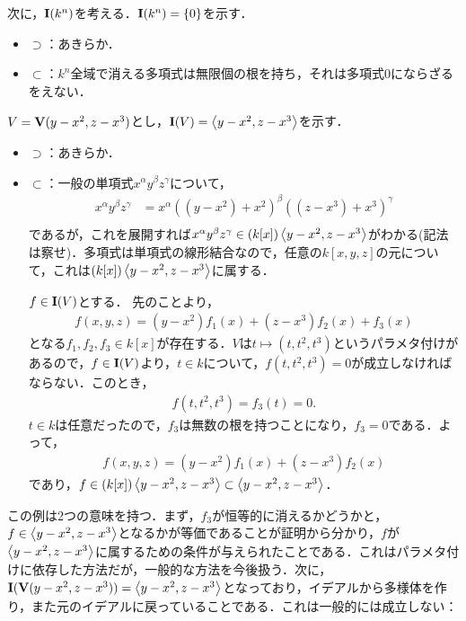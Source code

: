 \documentclass[9pt]{ltjsarticle}
\begin{document}
次に，$\textbf I(k^n)$を考える．$\textbf I(k^n)=\{0\}$を示す．
\begin{myproof}
 \begin{itemize}
  \item $\supset$：あきらか．
  \item $\subset$：$k^n$全域で消える多項式は無限個の根を持ち，それは多項式0にならざるをえない．
 \end{itemize}
\end{myproof}

$V=\textbf V(y-x^2,z-x^3)$とし，$\textbf I(V)=\left\langle y-x^2,z-x^3 \right\rangle$を示す．
\begin{myproof}
 \begin{itemize}
  \item $\supset$：あきらか．
  \item $\subset$：一般の単項式$x^\alpha y^\beta z^\gamma$について，
\begin{align}
 x^\alpha y^\beta z^\gamma
&=
x^\alpha ((y - x^2) + x^2)^\beta  ((z-x^3)+x^3)^\gamma\\
\end{align}
であるが，これを展開すれば$x^\alpha y^\beta z^\gamma \in (k[x])\left\langle y-x^2,z-x^3 \right\rangle$がわかる(記法は察せ)．多項式は単項式の線形結合なので，任意の$k[x,y,z]$の元について，これは$(k[x])\left\langle y-x^2,z-x^3 \right\rangle$に属する．

$f\in \textbf I (V)$とする．
先のことより，
\begin{align}
 f(x,y,z) = (y-x^2)f_1(x) + (z-x^3)f_2(x) + f_3(x)
\end{align}
となる$f_1,f_2,f_3\in k[x]$が存在する．$V$は$t\mapsto (t,t^2,t^3)$というパラメタ付けがあるので，$f\in \textbf I(V)$より，$t\in k$について，$f(t,t^2,t^3)=0$が成立しなければならない．このとき，
\begin{align}
 f(t,t^2,t^3) = f_3(t) = 0.
\end{align}
$t\in k$は任意だったので，$f_3$は無数の根を持つことになり，$f_3=0$である．よって，
\begin{align}
 f(x,y,z) = (y-x^2)f_1(x) + (z-x^3)f_2(x)
\end{align}
であり，$f\in (k[x])\left\langle y-x^2,z-x^3 \right\rangle \subset \left\langle y-x^2,z-x^3 \right\rangle$．
 \end{itemize}
\end{myproof}
この例は2つの意味を持つ．まず，$f_3$が恒等的に消えるかどうかと，$f\in \left\langle y-x^2,z-x^3 \right\rangle$となるかが等価であることが証明から分かり，$f$が$\left\langle y-x^2,z-x^3 \right\rangle$に属するための条件が与えられたことである．これはパラメタ付けに依存した方法だが，一般的な方法を今後扱う．次に，$\textbf I(\textbf V(y-x^2,z-x^3))=\left\langle y-x^2,z-x^3 \right\rangle$となっており，イデアルから多様体を作り，また元のイデアルに戻っていることである．これは一般的には成立しない：
\end{document}

